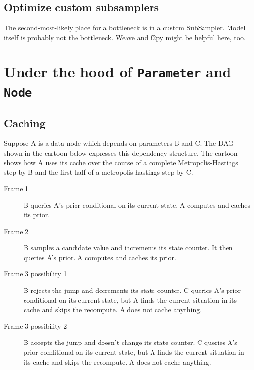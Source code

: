 \documentclass[]{book}
\begin{document}
\subsection{Optimize custom subsamplers}\label{sub:optimize_custom_subsamplers}
The second-most-likely place for a bottleneck is in a custom SubSampler. Model itself is probably not the bottleneck. Weave and f2py might be helpful here, too.

\section{Under the hood of \texttt{Parameter} and \texttt{Node}}\label{underhood} %

\subsection{Caching}\label{sub:caching}

Suppose A  is a data node which depends on parameters  B  and  C. The DAG shown in the cartoon below expresses this dependency structure. The cartoon shows how A uses its cache over the course of a complete Metropolis-Hastings step by B and the first half of a metropolis-hastings step by C. 

\begin{description}
\item[Frame 1] B queries A's prior conditional on its current state. A computes and caches its prior.
\begin{center}
\end{center}

\item[Frame 2] B samples a candidate value and increments its state counter. It then queries A's prior. A computes and caches its prior.
\begin{center}
\end{center}

\item[Frame 3 possibility 1] B rejects the jump and decrements its state counter. C queries A's prior conditional on its current state, but A finds the current situation in its cache and skips the recompute. A does not cache anything.
\begin{center}
\end{center}

\item[Frame 3 possibility 2] B accepts the jump and doesn't change its state counter. C queries A's prior conditional on its current state, but A finds the current situation in its cache and skips the recompute. A does not cache anything.
\begin{center}
\end{center}

\end{description}
\end{document}
